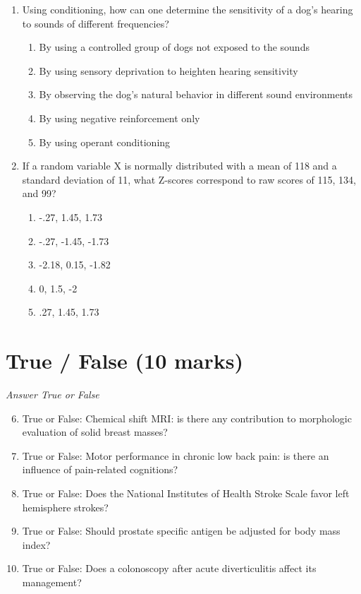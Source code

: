 \documentclass[12pt]{article}
\begin{document}
\begin{enumerate}[label=\arabic*.]
\begin{enumerate}[label=(\alph*)]
\end{enumerate}
\item Using conditioning, how can one determine the sensitivity of a dog's hearing to sounds of different frequencies?
\begin{enumerate}[label=(\alph*)]
    \item By using a controlled group of dogs not exposed to the sounds
    \item By using sensory deprivation to heighten hearing sensitivity
    \item By observing the dog's natural behavior in different sound environments
    \item By using negative reinforcement only
    \item By using operant conditioning
\end{enumerate}
\item If a random variable X is normally distributed with a mean of 118 and a standard deviation of 11, what Z-scores correspond to raw scores of 115, 134, and 99?
\begin{enumerate}[label=(\alph*)]
    \item -.27, 1.45, 1.73
    \item -.27, -1.45, -1.73
    \item -2.18, 0.15, -1.82
    \item 0, 1.5, -2
    \item .27, 1.45, 1.73
\end{enumerate}
\end{enumerate}

\section*{True / False (10 marks)}
\textit{Answer True or False}
\begin{enumerate}[label=\arabic*.]
\setcounter{enumi}{5}
\item True or False: Chemical shift MRI: is there any contribution to morphologic evaluation of solid breast masses?
\item True or False: Motor performance in chronic low back pain: is there an influence of pain-related cognitions?
\item True or False: Does the National Institutes of Health Stroke Scale favor left hemisphere strokes?
\item True or False: Should prostate specific antigen be adjusted for body mass index?
\item True or False: Does a colonoscopy after acute diverticulitis affect its management?
\end{enumerate}
\end{document}
